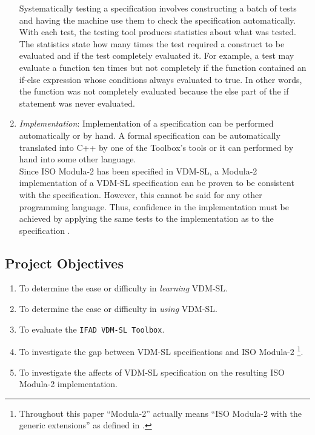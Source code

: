 \documentclass[11pt]{article}
\begin{document}
\begin{enumerate}
Systematically testing a specification involves constructing a batch of tests and having the machine use them to check the specification automatically.  With each test, the testing tool produces statistics about what was tested.  The statistics state how many times the test required a construct to be evaluated and if the test completely evaluated it.  For example, a test may evaluate a function ten times but not completely if the function contained an if-else expression whose conditions always evaluated to true.  In other words, the function was not completely evaluated because the else part of the if statement was never evaluated.
\item {\it Implementation}: Implementation of a specification can be performed automatically or by hand.  A formal specification can be automatically translated into C++ by one of the Toolbox's tools or it can performed by hand into some other language.\\

Since ISO Modula-2 has been specified in VDM-SL, a Modula-2 implementation of a VDM-SL specification can be proven to be consistent with the specification.  However, this cannot be said for any other programming language.  Thus, confidence in the implementation must be achieved by applying the same tests to the implementation as to the specification \cite{ELL}.
\end{enumerate}
\subsection{Project Objectives}
\begin{enumerate}
\item To determine the ease or difficulty in {\em learning} VDM-SL.
\item To determine the ease or difficulty in {\em using} VDM-SL.
\item To evaluate the {\tt IFAD VDM-SL Toolbox}.
\item To investigate the gap between VDM-SL specifications and ISO Modula-2 \footnote{Throughout this paper ``Modula-2'' actually means ``ISO Modula-2 with the generic extensions'' as defined in \cite{SR}.}.
\item To investigate the affects of VDM-SL specification on the resulting ISO Modula-2 implementation.
\end{enumerate}
\end{document}
